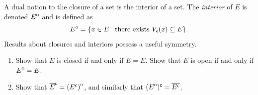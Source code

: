 \documentclass{lew98_solutions}
\begin{document}
\begin{exercise}
\label{ex:3.2.14}
    A dual notion to the closure of a set is the interior of a set. The \textit{interior} of \( E \) is denoted \( {\kern0ptE}^{\mathrm{o}} \) and is defined as
    \[
        {\kern0ptE}^{\mathrm{o}} = \{ x \in E : \text{there exists } V_{\epsilon}(x) \subseteq E \}.
    \]
    Results about closures and interiors possess a useful symmetry.
    \begin{enumerate}
        \item Show that \( E \) is closed if and only if \( \overline{E} = E \). Show that \( E \) is open if and only if \( {\kern0ptE}^{\mathrm{o}} = E \).

        \item Show that \( \overline{E}^{\mathsf{c}} = {\kern0pt(E^{\mathsf{c}})}^{\mathrm{o}} \), and similarly that \( ({\kern0ptE}^{\mathrm{o}})^{\mathsf{c}} = \overline{E^{\mathsf{c}}} \).
    \end{enumerate}
\end{exercise}
\end{document}
